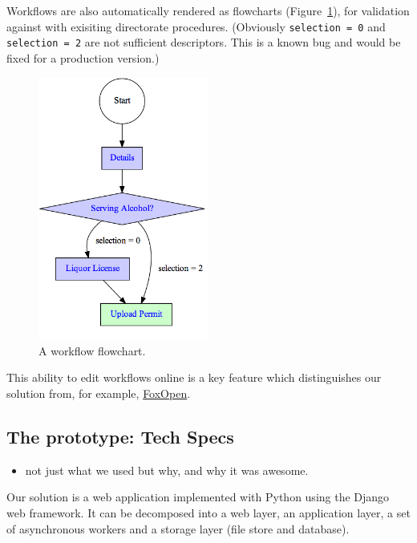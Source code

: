 \documentclass[12pt,a4paper,twosided]{article}
\begin{document}
Workflows are also automatically rendered as flowcharts (Figure~\ref{fig:workflow-flowchart}), 
for validation against with exisiting directorate procedures. (Obviously
\texttt{selection = 0} and \texttt{selection = 2} are not sufficient
descriptors. This is a known bug and would be fixed for a production
version.)

\begin{figure}[H]
  \centering
  \includegraphics[width=0.5\textwidth]{workflow.png}
  \caption{A workflow flowchart.}
  \label{fig:workflow-flowchart}
\end{figure}

This ability to edit workflows online is a key feature which
distinguishes our solution from, for example,
\href{http://www.foxopen.net/}{FoxOpen}.

\subsection{The prototype: Tech Specs}

\begin{itemize}

\item
  not just what we used but why, and why it was awesome.
\end{itemize}

Our solution is a web application implemented with Python using the
Django web framework. It can be decomposed into a web layer, an
application layer, a set of asynchronous workers and a storage layer
(file store and database).
\end{document}
